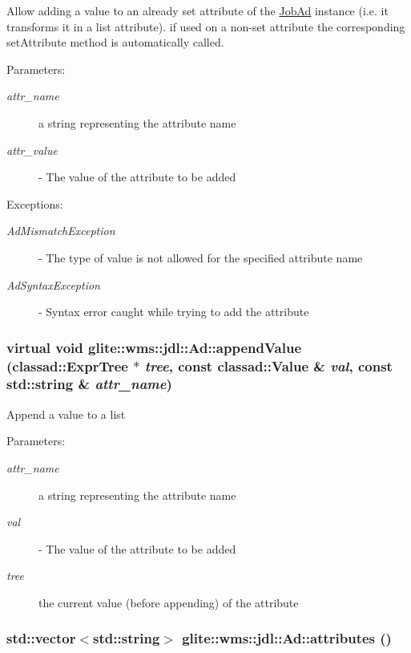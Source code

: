 Allow adding a value to an already set attribute of the \hyperlink{classglite_1_1wms_1_1jdl_1_1JobAd}{Job\-Ad} instance (i.e. it transforms it in a list attribute). if used on a non-set attribute the corresponding set\-Attribute method is automatically called. \begin{Desc}
\item[Parameters:]
\begin{description}
\item[{\em attr\_\-name}]a string representing the attribute name \item[{\em attr\_\-value}]- The value of the attribute to be added \end{description}
\end{Desc}
\begin{Desc}
\item[Exceptions:]
\begin{description}
\item[{\em Ad\-Mismatch\-Exception}]- The type of value is not allowed for the specified attribute name \item[{\em Ad\-Syntax\-Exception}]- Syntax error caught while trying to add the attribute \end{description}
\end{Desc}
\hypertarget{classglite_1_1wms_1_1jdl_1_1Ad_b1}{
\subsubsection[appendValue]{\setlength{\rightskip}{0pt plus 5cm}virtual void glite::wms::jdl::Ad::append\-Value (classad::Expr\-Tree $\ast$ {\em tree}, const classad::Value \& {\em val}, const std::string \& {\em attr\_\-name})}}
\label{classglite_1_1wms_1_1jdl_1_1Ad_b1}


Append a value to a list \begin{Desc}
\item[Parameters:]
\begin{description}
\item[{\em attr\_\-name}]a string representing the attribute name \item[{\em val}]- The value of the attribute to be added \item[{\em tree}]the current value (before appending) of the attribute\end{description}
\end{Desc}
\hypertarget{classglite_1_1wms_1_1jdl_1_1Ad_z17_3}{
\subsubsection[attributes]{\setlength{\rightskip}{0pt plus 5cm}std::vector$<$std::string$>$ glite::wms::jdl::Ad::attributes ()}}
\label{classglite_1_1wms_1_1jdl_1_1Ad_z17_3}


